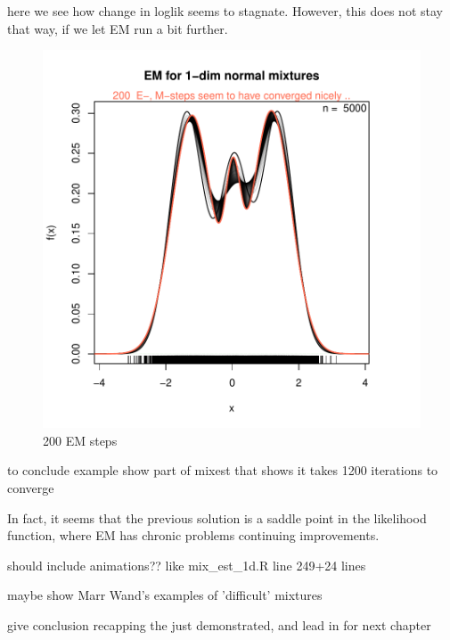 
here we see how change in loglik seems to stagnate. However, this does not stay that way, if we let EM run a bit further.


\begin{figure}
\begin{center}
\includegraphics{chapter1-006}
\end{center}
\caption{200 EM steps}
\label{adfafdafds}
\end{figure}

to conclude example show part of mixest that shows it takes 1200 iterations to converge

In fact, it seems that the previous solution is a saddle point in the likelihood function, where EM has chronic problems continuing improvements.

should include animations?? like mix\_est\_1d.R line 249+24 lines

maybe show Marr Wand's examples of 'difficult' mixtures

give conclusion recapping the just demonstrated, and lead in for next chapter





